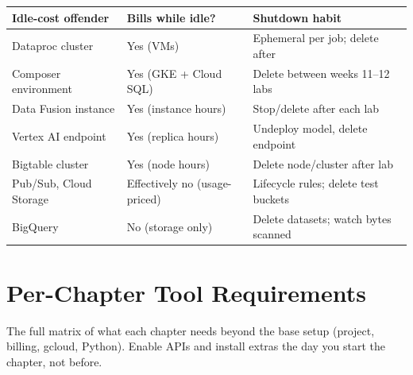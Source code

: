 \begin{center}
\footnotesize
\begin{tabular}{@{}p{4.2cm}p{4.4cm}p{4.2cm}@{}}
\toprule
\textbf{Idle-cost offender} & \textbf{Bills while idle?} & \textbf{Shutdown habit} \\
\midrule
Dataproc cluster & Yes (VMs) & Ephemeral per job; delete after \\
Composer environment & Yes (GKE + Cloud SQL) & Delete between weeks 11--12 labs \\
Data Fusion instance & Yes (instance hours) & Stop/delete after each lab \\
Vertex AI endpoint & Yes (replica hours) & Undeploy model, delete endpoint \\
Bigtable cluster & Yes (node hours) & Delete node/cluster after lab \\
Pub/Sub, Cloud Storage & Effectively no (usage-priced) & Lifecycle rules; delete test buckets \\
BigQuery & No (storage only) & Delete datasets; watch bytes scanned \\
\bottomrule
\end{tabular}
\end{center}

\section{Per-Chapter Tool Requirements}
%
The full matrix of what each chapter needs beyond the base setup (project, billing, gcloud,
Python). Enable APIs and install extras the day you start the chapter, not before.

